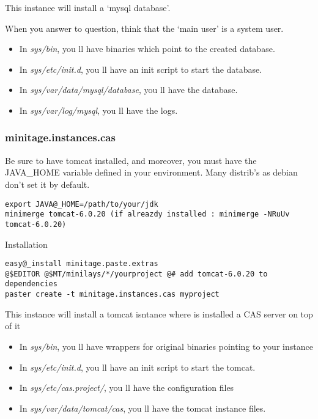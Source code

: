 \documentclass[letterpaper,10pt,english]{sphinxmanual}
\begin{document}
This instance will install a `mysql database'.

When you answer to question, think that the `main user' is a system user.
\begin{itemize}
\item {} 
In \emph{sys/bin}, you ll have binaries which point to the created database.

\item {} 
In \emph{sys/etc/init.d}, you ll have an init script to start the database.

\item {} 
In \emph{sys/var/data/mysql/database}, you ll have the database.

\item {} 
In \emph{sys/var/log/mysql}, you ll have the logs.

\end{itemize}


\subsubsection{minitage.instances.cas}
\label{paster/instances/instances:minitage-instances-cas}
Be sure to have tomcat installed, and moreover, you must have the JAVA\_HOME variable defined in your environment.
Many distrib's as debian don't set it by default.

\begin{Verbatim}[commandchars=@\[\]]
export JAVA@_HOME=/path/to/your/jdk
minimerge tomcat-6.0.20 (if alreazdy installed : minimerge -NRuUv tomcat-6.0.20)
\end{Verbatim}

Installation

\begin{Verbatim}[commandchars=@\[\]]
easy@_install minitage.paste.extras
@$EDITOR @$MT/minilays/*/yourproject @# add tomcat-6.0.20 to dependencies
paster create -t minitage.instances.cas myproject
\end{Verbatim}

This instance will install a tomcat isntance where is installed a CAS server on top of it
\begin{itemize}
\item {} 
In \emph{sys/bin}, you ll have wrappers for original binaries pointing to your instance

\item {} 
In \emph{sys/etc/init.d}, you ll have an init script to start the tomcat.

\item {} 
In \emph{sys/etc/cas.project/}, you ll have the configuration files

\item {} 
In \emph{sys/var/data/tomcat/cas}, you ll have the tomcat instance files.

\end{itemize}
\end{document}

